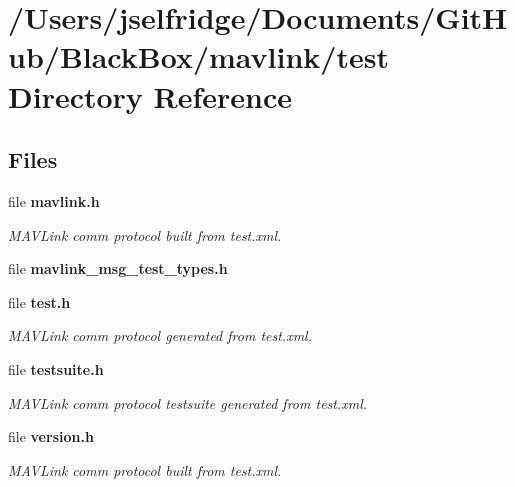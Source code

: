 \section{/\+Users/jselfridge/\+Documents/\+Git\+Hub/\+Black\+Box/mavlink/test Directory Reference}
\label{dir_43a37fee57064abd66f3ce83166cb29a}
\subsection*{Files}
\begin{DoxyCompactItemize}
\item 
file \textbf{ mavlink.\+h}
\begin{DoxyCompactList}\small\item\em M\+A\+V\+Link comm protocol built from test.\+xml. \end{DoxyCompactList}\item 
file \textbf{ mavlink\+\_\+msg\+\_\+test\+\_\+types.\+h}
\item 
file \textbf{ test.\+h}
\begin{DoxyCompactList}\small\item\em M\+A\+V\+Link comm protocol generated from test.\+xml. \end{DoxyCompactList}\item 
file \textbf{ testsuite.\+h}
\begin{DoxyCompactList}\small\item\em M\+A\+V\+Link comm protocol testsuite generated from test.\+xml. \end{DoxyCompactList}\item 
file \textbf{ version.\+h}
\begin{DoxyCompactList}\small\item\em M\+A\+V\+Link comm protocol built from test.\+xml. \end{DoxyCompactList}\end{DoxyCompactItemize}
